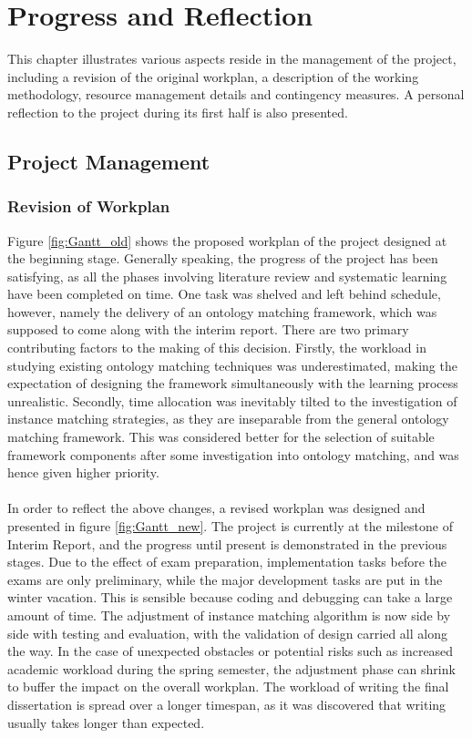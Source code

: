 \chapter{Progress and Reflection}

This chapter illustrates various aspects reside in the management of the project, including a revision of the original workplan, a description of the working methodology, resource management details and contingency measures. A personal reflection to the project during its first half is also presented. 

\section{Project Management}

\subsection{Revision of Workplan}
Figure \ref{fig:Gantt_old} shows the proposed workplan of the project designed at the beginning stage. Generally speaking, the progress of the project has been satisfying, as all the phases involving literature review and systematic learning have been completed on time. One task was shelved and left behind schedule, however, namely the delivery of an ontology matching framework, which was supposed to come along with the interim report. There are two primary contributing factors to the making of this decision. Firstly, the workload in studying existing ontology matching techniques was underestimated, making the expectation of designing the framework simultaneously with the learning process unrealistic. Secondly, time allocation was inevitably tilted to the investigation of instance matching strategies, as they are inseparable from the general ontology matching framework. This was considered better for the selection of suitable framework components after some investigation into ontology matching, and was hence given higher priority.
\\\\
In order to reflect the above changes, a revised workplan was designed and presented in figure \ref{fig:Gantt_new}. The project is currently at the milestone of Interim Report, and the progress until present is demonstrated in the previous stages. Due to the effect of exam preparation, implementation tasks before the exams are only preliminary, while the major development tasks are put in the winter vacation. This is sensible because coding and debugging can take a large amount of time. The adjustment of instance matching algorithm is now side by side with testing and evaluation, with the validation of design carried all along the way. In the case of unexpected obstacles or potential risks such as increased academic workload during the spring semester, the adjustment phase can shrink to buffer the impact on the overall workplan. The workload of writing the final dissertation is spread over a longer timespan, as it was discovered that writing usually takes longer than expected.

